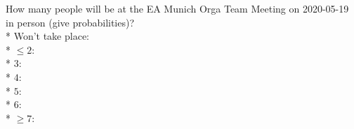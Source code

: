 \documentclass{article}
\begin{document}
How many people will be at the EA Munich Orga Team Meeting on 2020-05-19
in person (give probabilities)?\\*
Won't take place: \null\hfill\underline{\hspace{5cm}}\\*
$\le 2$: \null\hfill\underline{\hspace{5cm}}\\*
$3$: \null\hfill\underline{\hspace{5cm}}\\*
$4$: \null\hfill\underline{\hspace{5cm}}\\*
$5$: \null\hfill\underline{\hspace{5cm}}\\*
$6$: \null\hfill\underline{\hspace{5cm}}\\*
$\ge 7$: \null\hfill\underline{\hspace{5cm}}
\end{document}
